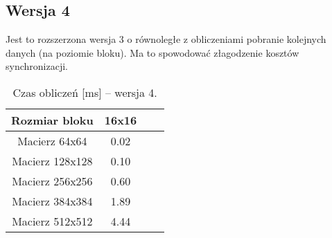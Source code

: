 
\subsection{Wersja 4}

Jest to rozszerzona wersja 3 o równoległe z obliczeniami pobranie kolejnych danych (na poziomie bloku). Ma to spowodować złagodzenie kosztów synchronizacji.



\begin{table}[H]
\centering
\begin{tabular}{|c|c|c|c|}
\hline
Rozmiar bloku & 16x16 \\ \hline
Macierz 64x64 & 0.02 \\ \hline
Macierz 128x128 & 0.10 \\ \hline
Macierz 256x256 & 0.60 \\ \hline
Macierz 384x384 & 1.89 \\ \hline
Macierz 512x512 & 4.44 \\ \hline
\end{tabular}
\caption{Czas obliczeń [ms] -- wersja 4.}
\end{table}
